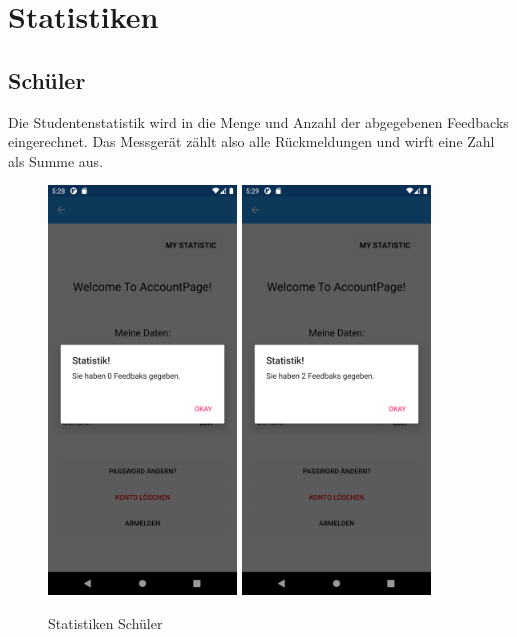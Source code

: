 \section{Statistiken}
\subsection{Schüler}
Die Studentenstatistik wird in die Menge und Anzahl der abgegebenen Feedbacks eingerechnet. Das Messgerät zählt also alle Rückmeldungen und wirft eine Zahl als Summe aus.
\begin{figure}[h]
    \begin{center}
        \includegraphics[width=5cm]{pics/Xamarin Student/27 Stat.png}\hfill
        \includegraphics[width=5cm]{pics/Xamarin Student/28 Stat.png}
        \caption[Statistiken Schüler Ansicht]{Statistiken Schüler}
        \end{center}
\end{figure}
\newpage
